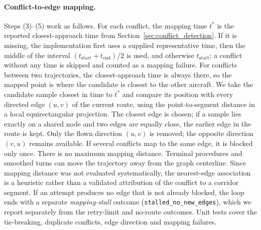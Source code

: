 \paragraph{Conflict-to-edge mapping.}
Steps (3)--(5) work as follows. For each conflict, the mapping time \(t^{*}\) is the reported closest-approach time from Section~\ref{sec:conflict_detection}. If it is missing, the implementation first uses a supplied representative time, then the middle of the interval \((t_{\text{start}} + t_{\text{end}})/2\) is used, and otherwise \(t_{\text{start}}\); a conflict without any time is skipped and counted as a mapping failure. For conflicts between two trajectories, the closest-approach time is always there, so the mapped point is where the candidate is closest to the other aircraft. We take the candidate sample closest in time to \(t^{*}\) and compare its position with every directed edge \((u,v)\) of the current route, using the point-to-segment distance in a local equirectangular projection. The closest edge is chosen; if a sample lies exactly on a shared node and two edges are equally close, the earlier edge in the route is kept. Only the flown direction \((u,v)\) is removed; the opposite direction \((v,u)\) remains available. If several conflicts map to the same edge, it is blocked only once. There is no maximum mapping distance. Terminal procedures and smoothed turns can move the trajectory away from the graph centerline. Since mapping distance was not evaluated systematically, the nearest-edge association is a heuristic rather than a validated attribution of the conflict to a corridor segment. If an attempt produces no edge that is not already blocked, the loop ends with a separate \emph{mapping-stall} outcome (\texttt{stalled\_no\_new\_edges}), which we report separately from the retry-limit and no-route outcomes. Unit tests cover the tie-breaking, duplicate conflicts, edge direction and mapping failures.

